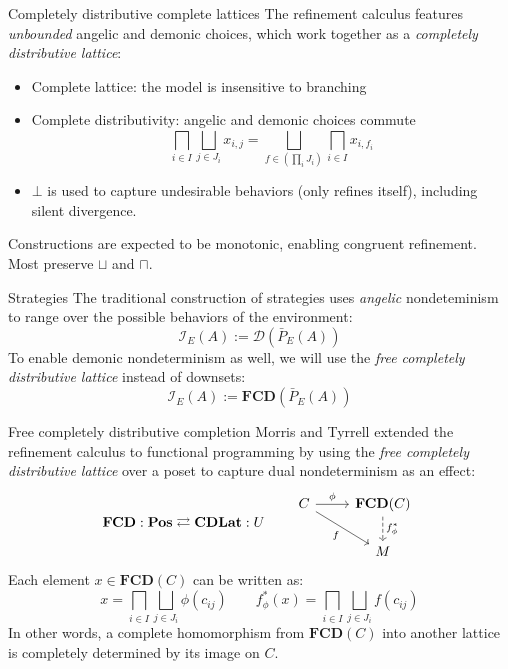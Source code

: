 \documentclass{beamer}
\begin{document}
\begin{frame}{Completely distributive complete lattices} %
The refinement calculus features \emph{unbounded}
angelic and demonic choices,
which work together as a
\emph{completely distributive lattice}:
\begin{itemize}
  \item Complete lattice: the model is insensitive to branching
  \item Complete distributivity: angelic and demonic choices commute
  \[
      \bigsqcap_{i \in I} \bigsqcup_{j \in J_i} x_{i,j} =
      \bigsqcup_{f \in (\prod_i J_i)} \bigsqcap_{i \in I} x_{i, f_i}
  \]
  \item $\bot$ is used to capture undesirable behaviors (only refines itself),
    including silent divergence.
\end{itemize}
Constructions are expected to be monotonic,
enabling congruent refinement.
Most preserve $\sqcup$ and $\sqcap$.
\end{frame}

\begin{frame}{Strategies} %
The traditional construction of strategies
uses \emph{angelic} nondeteminism
to range over the possible behaviors of the environment:
\[
  \mathcal{I}_E(A) := \mathcal{D}(\bar{P}_E(A))
\]
To enable demonic nondeterminism as well,
we will use the
\emph{free completely distributive lattice}
instead of downsets:
\[
  \mathcal{I}_E(A) := \mathbf{FCD}(\bar{P}_E(A))
\]
\end{frame}

\begin{frame}[fragile]{Free completely distributive completion} %
Morris and Tyrrell extended the refinement calculus
to functional programming by using
the \emph{free completely distributive lattice}
over a poset to capture dual nondeterminism as an effect:
\[
  \mathbf{FCD} : \mathbf{Pos} \rightleftarrows \mathbf{CDLat} : U
  \qquad
  \begin{tikzcd}
    C \arrow[r, "\phi"] \arrow[rd, "f"'] &
    \mathbf{FCD}(C) \arrow[d, "f^*_\phi", dashed] \\ & M
  \end{tikzcd}
\]
Each element $x \in \mathbf{FCD}(C)$ can be written as:
\[
  x = \bigsqcap_{i \in I} \bigsqcup_{j \in J_i} \phi(c_{ij})
  \qquad
  f^*_\phi(x) = \bigsqcap_{i \in I} \bigsqcup_{j \in J_i} f(c_{ij})
\]
In other words,
a complete homomorphism from $\mathbf{FCD}(C)$ into another lattice
is completely determined by its image on $C$.
\end{frame}
\end{document}
